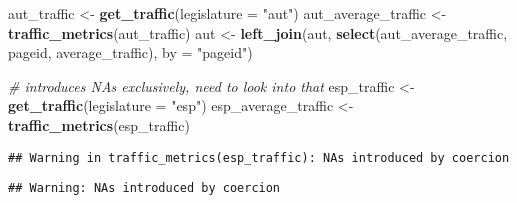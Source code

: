 \documentclass[
]{article}
\newenvironment{Shaded}{\begin{snugshade}}{\end{snugshade}}
\newcommand{\AttributeTok}[1]{\textcolor[rgb]{0.13,0.29,0.53}{#1}}
\newcommand{\CommentTok}[1]{\textcolor[rgb]{0.56,0.35,0.01}{\textit{#1}}}
\newcommand{\FunctionTok}[1]{\textcolor[rgb]{0.13,0.29,0.53}{\textbf{#1}}}
\newcommand{\NormalTok}[1]{#1}
\newcommand{\OtherTok}[1]{\textcolor[rgb]{0.56,0.35,0.01}{#1}}
\newcommand{\SpecialCharTok}[1]{\textcolor[rgb]{0.81,0.36,0.00}{\textbf{#1}}}
\newcommand{\StringTok}[1]{\textcolor[rgb]{0.31,0.60,0.02}{#1}}
\begin{document}
\begin{Shaded}
\begin{Highlighting}[]
\NormalTok{aut\_traffic }\OtherTok{\textless{}{-}} \FunctionTok{get\_traffic}\NormalTok{(}\AttributeTok{legislature =} \StringTok{"aut"}\NormalTok{)}
\NormalTok{aut\_average\_traffic }\OtherTok{\textless{}{-}} \FunctionTok{traffic\_metrics}\NormalTok{(aut\_traffic)}
\NormalTok{aut }\OtherTok{\textless{}{-}} \FunctionTok{left\_join}\NormalTok{(aut, }\FunctionTok{select}\NormalTok{(aut\_average\_traffic, pageid, average\_traffic), }\AttributeTok{by =} \StringTok{"pageid"}\NormalTok{)}


\CommentTok{\# introduces NAs exclusively, need to look into that}
\NormalTok{esp\_traffic }\OtherTok{\textless{}{-}} \FunctionTok{get\_traffic}\NormalTok{(}\AttributeTok{legislature =} \StringTok{"esp"}\NormalTok{)}
\NormalTok{esp\_average\_traffic }\OtherTok{\textless{}{-}} \FunctionTok{traffic\_metrics}\NormalTok{(esp\_traffic)}
\end{Highlighting}
\end{Shaded}

\begin{verbatim}
## Warning in traffic_metrics(esp_traffic): NAs introduced by coercion
\end{verbatim}

\begin{Shaded}
\end{Shaded}

\begin{verbatim}
## Warning: NAs introduced by coercion
\end{verbatim}
\end{document}
